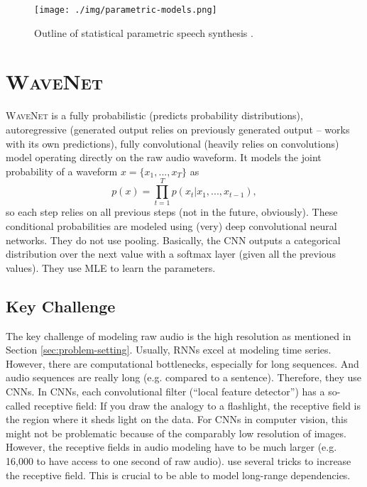 \begin{figure}[h]
	\centering
		\texttt{[image: ./img/parametric-models.png]}
	\caption{Outline of statistical parametric speech synthesis \parencite{oord_wavenet:_2016}.}
	\label{fig:parametric-models}
\end{figure}

\section{\textsc{WaveNet}}
\label{wavenet}
\textsc{WaveNet} is a fully probabilistic (predicts probability distributions), autoregressive (generated output relies on previously generated output -- works with its own predictions), fully convolutional (heavily relies on convolutions) model operating directly on the raw audio waveform. It models the joint probability of a waveform $x = \{x_1, ..., x_T\}$ as
\begin{equation}
	p(x) = \prod\limits_{t=1}^{T} p(x_t \vert x_1, ..., x_{t-1}),
	\label{eq:joint-probability}
\end{equation}
so each step relies on all previous steps (not in the future, obviously). These conditional probabilities are modeled using (very) deep convolutional neural networks. They do not use pooling. Basically, the CNN outputs a categorical distribution over the next value with a softmax layer (given all the previous values). They use MLE to learn the parameters.\\

\subsection{Key Challenge}
\label{sec:key-challenge}
The key challenge of modeling raw audio is the high resolution as mentioned in Section \ref{sec:problem-setting}. Usually, RNNs excel at modeling time series. However, there are computational bottlenecks, especially for long sequences. And audio sequences are really long (e.g. compared to a sentence). Therefore, they use CNNs. In CNNs, each convolutional filter (``local feature detector'') has a so-called receptive field: If you draw the analogy to a flashlight, the receptive field is the region where it sheds light on the data. For CNNs in computer vision, this might not be problematic because of the comparably low resolution of images. However, the receptive fields in audio modeling have to be much larger (e.g. 16,000 to have access to one second of raw audio). \textcite{oord_wavenet:_2016} use several tricks to increase the receptive field. This is crucial to be able to model long-range dependencies.

